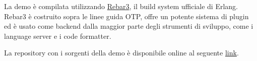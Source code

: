 \documentclass[target=bach,aauheader=,style=]{thud}
\newcommand{\eng}[1]{\foreignlanguage{english}{#1}}
\begin{document}
La demo è compilata utilizzando \href{https://rebar3.org/}{Rebar3}, il \eng{build system} ufficiale di Erlang. \eng{Rebar3} è costruito sopra le linee guida OTP, offre un potente sistema di \eng{plugin} ed è usato come backend dalla maggior parte degli strumenti di sviluppo, come i \eng{language server} e i \eng{code formatter}.
\bigskip

La \eng{repository} con i sorgenti della demo è disponibile online al seguente \href{https://github.com/Lucide/Gallager-Humblet-Spira}{link}.

\appendix



\backmatter





\end{document}
